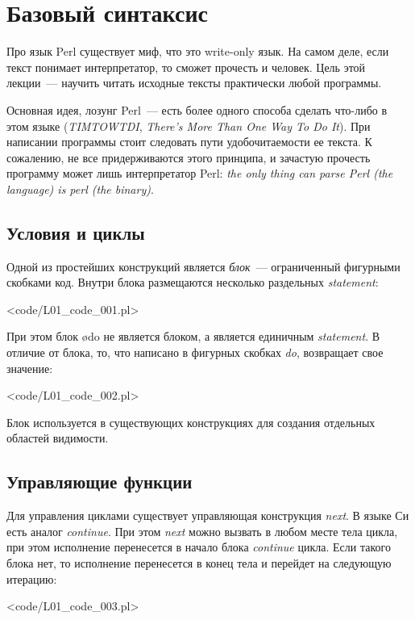 \newcommand\cmd[1]{\colorbox{gray!20}{\texttt{#1}\phantom{/}\!\!\!\!}}

\section{Базовый синтаксис}

Про язык Perl существует миф, что это write-only язык.
На самом деле, если текст понимает интерпретатор, то сможет прочесть и человек.
Цель этой лекции~--- научить читать исходные тексты практически любой программы.

Основная идея, лозунг Perl~--- есть более одного способа сделать что-либо в этом языке (\textit{TIMTOWTDI}, \textit{There's More Than One Way To Do It}).
При написании программы стоит следовать пути удобочитаемости ее текста.
К сожалению, не все придерживаются этого принципа, и зачастую прочесть программу может лишь интерпретатор Perl: \textit{the only thing can parse Perl (the language) is perl (the binary)}.

\subsection{Условия и циклы} 
Одной из простейших конструкций является \textit{блок}~--- ограниченный фигурными скобками код.
Внутри блока размещаются несколько раздельных \textit{statement}:

\pr<code/L01_code_001.pl>

При этом блок \o{do} не является блоком, а является единичным \textit{statement}.
В отличие от блока, то, что написано в фигурных скобках \textit{do}, возвращает свое значение:

\pr<code/L01_code_002.pl>

Блок используется в существующих конструкциях для создания отдельных областей видимости.

\subsection{Управляющие функции}
Для управления циклами существует управляющая конструкция \textit{next}.
В языке Си есть аналог \textit{continue}.
При этом \textit{next} можно вызвать в любом месте тела цикла, при этом исполнение перенесется в начало блока \textit{continue} цикла.
Если такого блока нет, то исполнение перенесется в конец тела и перейдет на следующую итерацию:

\pr<code/L01_code_003.pl>

